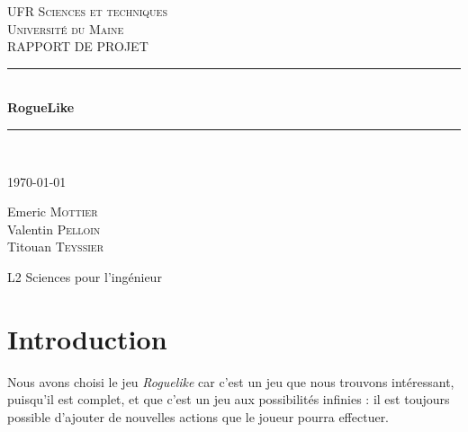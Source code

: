 \documentclass[11pt]{report}
\begin{document}
\begin{titlepage}
	
	\newcommand{\HRule}{\rule{\linewidth}{0.5mm}}
	\center
	
	\vspace*{30pt}
	
	\textsc{\Large UFR Sciences et techniques\\ Université du Maine}\\[1.5cm]
	
	\Large RAPPORT DE PROJET\\[1.5cm]
	

	\vspace*{\fill}
	
	\HRule \\[0.4cm]
	{ \huge \bfseries RogueLike}\\
	\HRule \\[1.5cm]
	 
	 
	 \vspace{20pt}
	 
	{\large \today}\\[1cm]
	
	\vspace{12pt}
	
	\Large 
	
		Emeric \textsc{Mottier}\\
		Valentin \textsc{Pelloin}\\
		Titouan \textsc{Teyssier}\\
	
		\vspace{12pt}
		
		L2 Sciences pour l'ingénieur
		
	\vspace*{\fill}
	
\end{titlepage}

\tableofcontents

\chapter{Introduction}

	Nous avons choisi le jeu \emph{Roguelike} car c'est un jeu que nous trouvons intéressant, puisqu'il est complet, et que c'est un jeu aux possibilités infinies :  il est toujours possible d'ajouter de nouvelles actions que le joueur pourra effectuer.
	
	\vspace{12pt}
	
\end{document}
